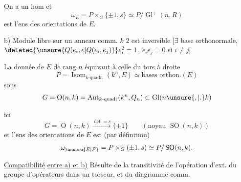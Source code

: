 On a un hom
et
\[
 \omega_E=P\times_G\{\pm1,s\}\simeq P/\operatorname{Gl}^+(n,R)
\]
est l'ens des orientations de $E$.

b) Module  libre   sur un anneau comm. $k$  $2$ est inversible [$\exists$ base orthonormale, $\deleted{\unsure{Q(e_i,e|Q(e_i,e_j)}} e_i^2=1$, $e_i e_j=0$ si $i\ne j$]

La donnée de $E$ de rang $n$ équivaut à celle du tors à droite
\[
 P=\operatorname{Isom}_{k\text{-quadr.}}(k^n,E)\simeq\text{bases orthon.}(E)
\]
sous
\[
 G=\operatorname{O}(n,k)=\operatorname{Aut}_{k\text{-quadr}}(k^n,Q_n)\subset\operatorname{Gl}(n\unsure{,|.}k)
\]

 ici
\[
 G=\operatorname{O}(n,k)\xrightarrow{\det=s}\{\pm1\}\qquad(\text{noyau }\operatorname{SO}(n,k))
\]
et l'ens des orientations de $E$ est (par définition)
\[
 \omega_{\unsure{E|F}}=P\times_G(\pm1,s)\simeq P/\operatorname{SO}(n,k).
\]

\uline{Compatibilité} \uline{entre a) et b)} Résulte de la transitivité de l'opération d'ext. du groupe d'opérateurs dans un torseur, et du diagramme comm.
